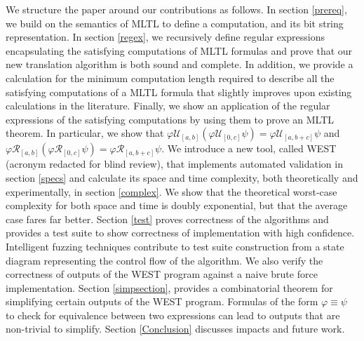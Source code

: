 \documentclass[runningheads]{llncs}
\renewcommand{\phi}{\varphi}
\begin{document}
We structure the paper around our contributions as follows. In section \ref{prereq}, we build on the semantics of MLTL to define a computation, and its bit string representation. %
%
In section \ref{regex}, we recursively define regular expressions encapsulating the satisfying computations of MLTL formulas and prove that our new translation algorithm is both sound and complete. In addition, we provide a calculation for the minimum computation length required to describe all the satisfying computations of a MLTL formula that slightly improves upon existing calculations in the literature. Finally, we show an application of the regular expressions of the satisfying computations by using them to prove an MLTL theorem. In particular, we show that $\phi\mathcal{U}_{[a,b]}(\phi\mathcal{U}_{[0,c]}\psi) = \phi\mathcal{U}_{[a,b+c]}\psi$ and $\phi\mathcal{R}_{[a,b]}(\phi\mathcal{R}_{[0,c]}\psi) = \phi\mathcal{R}_{[a,b+c]}\psi$.
%
We introduce a new tool, called WEST (acronym redacted for blind review), that implements automated validation in section \ref{specs} %
%
and calculate its space and time complexity, both theoretically and experimentally, in section \ref{complex}. We show that the theoretical worst-case complexity for both space and time is doubly exponential, but that the average case fares far better.
%
Section \ref{test} proves correctness of the algorithms and provides a test suite to show correctness of implementation with high confidence. Intelligent fuzzing techniques contribute to test suite construction from a state diagram representing the control flow of the algorithm. We also verify the correctness of outputs of the WEST program against a naive brute force implementation.
%
Section \ref{simpsection}, provides a combinatorial theorem for simplifying certain outputs of the WEST program. Formulas of the form $\phi \equiv \psi$ to check for equivalence between two expressions can lead to outputs that are non-trivial to simplify. Section \ref{Conclusion} discusses impacts and future work. 

\vspace{-0.1in}
\end{document}
